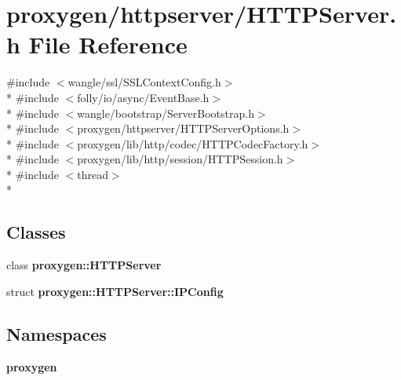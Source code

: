\section{proxygen/httpserver/\+H\+T\+T\+P\+Server.h File Reference}
\label{HTTPServer_8h}
{\ttfamily \#include $<$wangle/ssl/\+S\+S\+L\+Context\+Config.\+h$>$}\\*
{\ttfamily \#include $<$folly/io/async/\+Event\+Base.\+h$>$}\\*
{\ttfamily \#include $<$wangle/bootstrap/\+Server\+Bootstrap.\+h$>$}\\*
{\ttfamily \#include $<$proxygen/httpserver/\+H\+T\+T\+P\+Server\+Options.\+h$>$}\\*
{\ttfamily \#include $<$proxygen/lib/http/codec/\+H\+T\+T\+P\+Codec\+Factory.\+h$>$}\\*
{\ttfamily \#include $<$proxygen/lib/http/session/\+H\+T\+T\+P\+Session.\+h$>$}\\*
{\ttfamily \#include $<$thread$>$}\\*
\subsection*{Classes}
\begin{DoxyCompactItemize}
\item 
class {\bf proxygen\+::\+H\+T\+T\+P\+Server}
\item 
struct {\bf proxygen\+::\+H\+T\+T\+P\+Server\+::\+I\+P\+Config}
\end{DoxyCompactItemize}
\subsection*{Namespaces}
\begin{DoxyCompactItemize}
\item 
 {\bf proxygen}
\end{DoxyCompactItemize}
